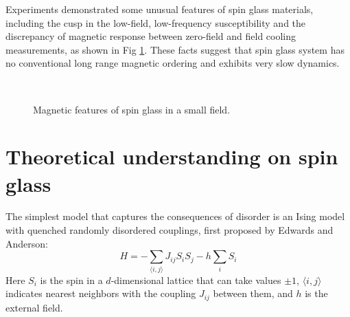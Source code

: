 Experiments demonstrated some unusual features of spin glass materials, 
including the cusp in the low-field, low-frequency susceptibility and the 
discrepancy of magnetic response between zero-field and field cooling 
measurements, as shown in Fig \ref{fig:experimentsSG}. These facts suggest that spin glass system has no conventional 
long range magnetic ordering and exhibits very slow dynamics. 

\begin{figure}[!h]
  \label{fig:experimentsSG}
  \centering
  \\  
  \caption{Magnetic features of spin glass in a small field.}
\end{figure}

\section{Theoretical understanding on spin glass}
The simplest model that captures the consequences of disorder is an Ising model 
with quenched randomly disordered couplings, first proposed by Edwards and 
Anderson:
\begin{equation}
  \label{eq:EA}
  H=-\sum_{\langle i,j \rangle}J_{ij}S_iS_j-h\sum_iS_i
\end{equation}
Here $S_i$ is the spin in a $d$-dimensional lattice that can take values $\pm 1$,
$\langle i,j \rangle$ indicates nearest neighbors with the coupling $J_{ij}$ between 
them, and $h$ is the external field.
 
